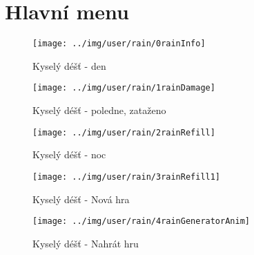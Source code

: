 
\section{Hlavní menu}



\begin{figure}[h!]\centering
\texttt{[image: ../img/user/rain/0rainInfo]}

\caption{Kyselý déšť - den}
\label{fig:user_rain_0rainInfo}

\end{figure}

\begin{figure}[h!]\centering
\texttt{[image: ../img/user/rain/1rainDamage]}

\caption{Kyselý déšť - poledne, zataženo}
\label{fig:user_rain_1rainDamage}

\end{figure}

\begin{figure}[h!]\centering
\texttt{[image: ../img/user/rain/2rainRefill]}

\caption{Kyselý déšť - noc}
\label{fig:user_rain_2rainRefill}

\end{figure}


\begin{figure}[h!]\centering
\texttt{[image: ../img/user/rain/3rainRefill1]}

\caption{Kyselý déšť - Nová hra}
\label{fig:user_rain_3rainRefill1}

\end{figure}

\begin{figure}[h!]\centering
\texttt{[image: ../img/user/rain/4rainGeneratorAnim]}

\caption{Kyselý déšť - Nahrát hru}
\label{fig:user_rain_4rainGeneratorAnim}

\end{figure}

